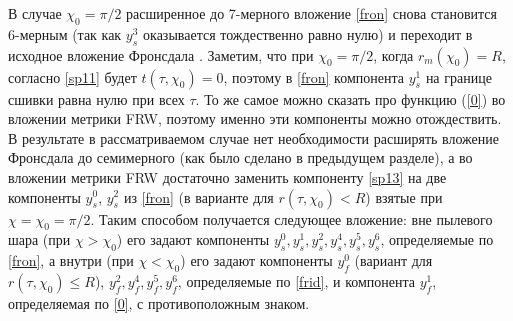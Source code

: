 \documentclass[12pt]{article}
\renewcommand{\sh}{\sinh}
\renewcommand{\ch}{\cosh}
\begin{document}
В случае $\chi_0 = \pi/2$ расширенное до 7-мерного вложение \eqref{fron} снова становится 6-мерным
(так как $y^3_s$ оказывается тождественно равно нулю) и переходит в исходное вложение Фронсдала \cite{frons}.
Заметим, что при $\chi_0 = \pi/2$, когда $r_m(\chi_0)=R$, согласно \eqref{sp11} будет
$t(\tau,\chi_0)=0$, поэтому в \eqref{fron} компонента $y_s^1$ на границе сшивки равна нулю при всех $\tau$.
То же самое можно сказать про функцию (\ref{0}) во вложении метрики FRW, поэтому
именно эти компоненты можно отождествить.
В результате в рассматриваемом случае
нет необходимости расширять вложение Фронсдала до семимерного (как было сделано в предыдущем разделе),
а во вложении метрики FRW достаточно заменить компоненту \eqref{sp13} на
две компоненты $y^0_s$, $y^2_s$ из \eqref{fron} (в варианте для $r(\tau, \chi_0)<R$)
взятые при $\chi=\chi_0=\pi/2$.
Таким способом получается следующее вложение: вне пылевого шара (при $\chi>\chi_0$)
его задают компоненты $y^0_s,y^1_s,y^2_s,y^4_s,y^5_s,y^6_s$, определяемые по \eqref{fron},
а внутри (при $\chi<\chi_0$) его задают компоненты $y^0_f$  (вариант для $r(\tau, \chi_0)\le R$),
$y^2_f,y^4_f,y^5_f,y^6_f$, определяемые по \eqref{frid}, и компонента $y^1_f$, определяемая по \eqref{0}, с противоположным знаком.
\end{document}
